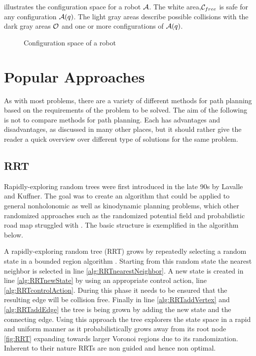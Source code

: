  illustrates the configuration space for a robot $\mathcal{A}$. The white area,$\mathcal{C}_{free}$ is safe for any configuration $\mathcal{A}(q)$. The light gray areas describe possible collisions with the dark gray areas $\mathcal{O}$ and one or more configurations of $\mathcal{A}(q)$.

\begin{figure}[h]
    \caption{Configuration space of a robot}
    \label{fig:configurationSpace}
\end{figure}

\section{Popular Approaches}
As with most problems, there are a variety of different methods for path planning based on the requirements of the problem to be solved. The aim of the following is not to compare methods for path planning. Each has advantages and disadvantages, as discussed in many other places, but it should rather give the reader a quick overview over different type of solutions for the same problem. %

\subsection{RRT}
Rapidly-exploring random trees were first introduced in the late 90s by Lavalle and Kuffner. The goal was to create an algorithm that could be applied to general nonholonomic as well as kinodynamic planning problems, which other randomized approaches such as the randomized potential field and probabilistic road map struggled with \cite{Lavalle.1998}. The basic structure is exemplified in the algorithm below.

A rapidly-exploring random tree (RRT) grows by repeatedly selecting a random state in a bounded region algorithm . Starting from this random state the nearest neighbor is selected in line \ref{alg:RRTnearestNeighbor}. A new state is created in line \ref{alg:RRTnewState} by using an appropriate control action, line \ref{alg:RRTcontrolAction}. During this phase it needs to be ensured that the resulting edge will be collision free. Finally in line \ref{alg:RRTaddVertex} and \ref{alg:RRTaddEdge} the tree is being grown by adding the new state and the connecting edge. Using this approach the tree explorers the state space in a rapid and uniform manner as it probabilistically grows away from its root node \ref{fig:RRT} expanding towards larger Voronoi regions due to its randomization. Inherent to their nature RRTs are non guided and hence non optimal. \cite{Lavalle.1999}

